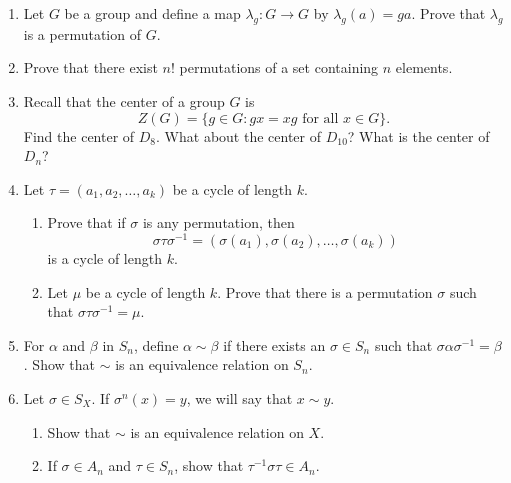 {\begin{enumerate}
\begin{enumerate}
 \bf \item \rm
$(12), (1 2 \ldots n )$
 
\end{enumerate}
 
 
\bf \item \rm
Let $G$ be a group and define a map $\lambda_g : G \rightarrow G$ by
$\lambda_g(a) = g a$.  Prove that $\lambda_g$ is a permutation of $G$.
 
 
 
\bf \item \rm
Prove that there exist $n!$ permutations of a set containing $n$
elements. 
 
 
\bf \item \rm
Recall that the {\bfi center} of a group $G$ is
$$
Z(G) = \{ g \in G : \mbox{$gx = xg$ for all $x \in G$} \}.
$$
Find the center of $D_8$. What about the center of $D_{10}$? What is
the center of $D_n$? 
 
 
\bf \item \rm
Let $\tau = (a_1, a_2, \ldots, a_k)$ be a cycle of length $k$.
\begin{enumerate}
 
 \bf \item \rm
Prove that if $\sigma$ is any permutation, then
$$
\sigma \tau \sigma^{-1 } = ( \sigma(a_1), \sigma(a_2), \ldots,
\sigma(a_k))
$$
is a cycle of length $k$.
 
 \bf \item \rm
Let $\mu$ be a cycle of length $k$. Prove that there is a permutation
$\sigma$ such that $\sigma \tau \sigma^{-1 } = \mu$.
 
\end{enumerate}
 
 
\bf \item \rm
For $\alpha$ and $\beta$ in $S_n$, define $\alpha \sim \beta$ if there
exists an $\sigma \in S_n$ such that $\sigma \alpha \sigma^{-1} =
\beta$.  Show that $\sim$ is an equivalence relation on $S_n$.
 
 
\bf \item \rm
Let $\sigma \in S_X$. If $\sigma^n(x) = y$, we will say that $x \sim
y$. 
\begin{enumerate}
 
 \bf \item \rm
Show that $\sim$ is an equivalence relation on $X$.
 
 \bf \item \rm
If $\sigma \in A_n$ and $\tau \in S_n$, show that $\tau^{-1} \sigma
\tau \in A_n$. 
 

\end{enumerate}
\end{enumerate}}
